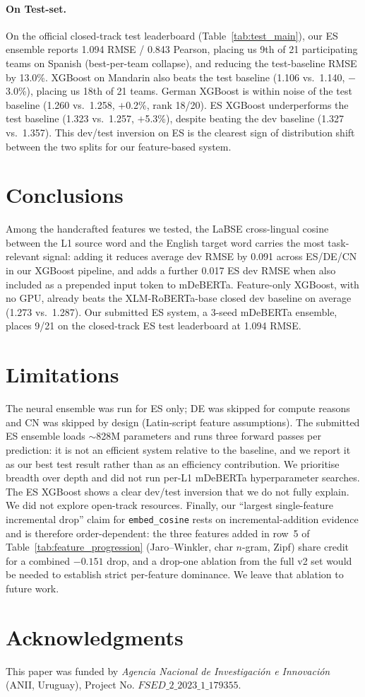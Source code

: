 \documentclass[11pt]{article}
\begin{document}
\paragraph{On Test-set.} On the official closed-track test leaderboard (Table~\ref{tab:test_main}), our ES ensemble reports 1.094 RMSE / 0.843 Pearson, placing us 9th of 21 participating teams on Spanish (best-per-team collapse), and reducing the test-baseline RMSE by 13.0\%. XGBoost on Mandarin also beats the test baseline (1.106 vs.\ 1.140, $-$3.0\%), placing us 18th of 21 teams. German XGBoost is within noise of the test baseline (1.260 vs.\ 1.258, $+$0.2\%, rank 18/20). ES XGBoost underperforms the test baseline (1.323 vs.\ 1.257, $+$5.3\%), despite beating the dev baseline (1.327 vs.\ 1.357). This dev/test inversion on ES is the clearest sign of distribution shift between the two splits for our feature-based system.

\section{Conclusions}
\label{sec:conclusions}

Among the handcrafted features we tested, the LaBSE cross-lingual cosine between the L1 source word and the English target word carries the most task-relevant signal: adding it reduces average dev RMSE by 0.091 across ES/DE/CN in our XGBoost pipeline, and adds a further 0.017 ES dev RMSE when also included as a prepended input token to mDeBERTa. Feature-only XGBoost, with no GPU, already beats the XLM-RoBERTa-base closed dev baseline on average (1.273 vs.\ 1.287). Our submitted ES system, a 3-seed mDeBERTa ensemble, places 9/21 on the closed-track ES test leaderboard at 1.094 RMSE.

\section{Limitations}
\label{sec:limitations}
The neural ensemble was run for ES only; DE was skipped for compute reasons and CN was skipped by design (Latin-script feature assumptions). The submitted ES ensemble loads $\sim$828M parameters and runs three forward passes per prediction: it is not an efficient system relative to the baseline, and we report it as our best test result rather than as an efficiency contribution. We prioritise breadth over depth and did not run per-L1 mDeBERTa hyperparameter searches. The ES XGBoost shows a clear dev/test inversion that we do not fully explain. We did not explore open-track resources. Finally, our ``largest single-feature incremental drop'' claim for \texttt{embed\_cosine} rests on incremental-addition evidence and is therefore order-dependent: the three features added in row~5 of Table~\ref{tab:feature_progression} (Jaro--Winkler, char $n$-gram, Zipf) share credit for a combined $-0.151$ drop, and a drop-one ablation from the full v2 set would be needed to establish strict per-feature dominance. We leave that ablation to future work.

\section*{Acknowledgments}

This paper was funded by \textit{Agencia Nacional de Investigación e Innovación} (ANII, Uruguay), Project No. $FSED\_2\_2023\_1\_179355$.


\end{document}
